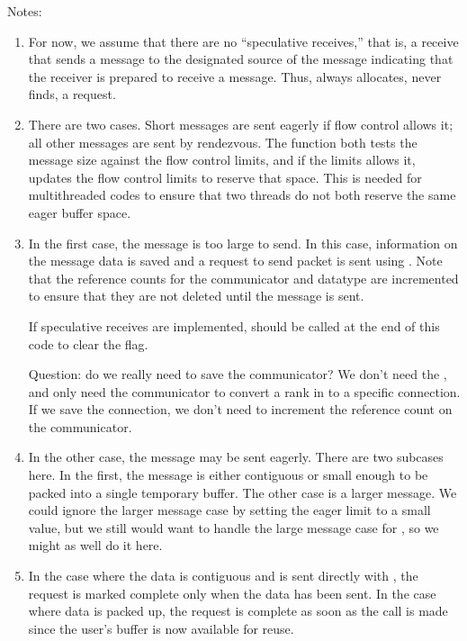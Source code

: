 Notes:
\begin{enumerate}
\item For now, we assume that there are no ``speculative receives,'' that is,
  a receive that sends a message to the designated source of the message
  indicating that the receiver is prepared to receive a message.  Thus, 
   always allocates, never finds, a request.

\item There are two cases.  Short messages are sent eagerly if flow control
  allows it; all other messages are sent by rendezvous.  
  The function  both tests the message size against
  the flow control limits, and if the limits allows it, updates the flow
  control limits to reserve that space.  This is needed for multithreaded
  codes to ensure that two threads do not both reserve the same eager buffer
  space.  

\item In the first case, the message is too large to send.  In this case,
  information on the message data is saved and a request to send packet is
  sent using .  Note that the reference counts for the
  communicator and datatype are incremented to ensure that they are not
  deleted until the message is sent.

  If speculative receives are implemented, 
  should be called at the end of this code to clear the  flag.

  Question: do we really need to save the communicator?  We don't need the
  , and only need the communicator to convert a rank in to a
  specific connection.  If we save the connection, we don't need to increment
  the reference count on the communicator.

\item In the other case, the message may be sent eagerly.  There are two
  subcases here.  In the first, the message is either contiguous or small
  enough to be packed into a single temporary buffer.  The other case is a
  larger message.  We could ignore the larger message case by setting the
  eager limit to a small value, but we still would want to handle the large
  message case for , so we might as well do it here.

\item In the case where the data is contiguous and is sent directly with
  , the request is marked complete only when the data has
  been sent.  In the case where data is packed up, the request is complete as
  soon as the  call is made since the user's buffer is now
  available for reuse.  


\end{enumerate}
